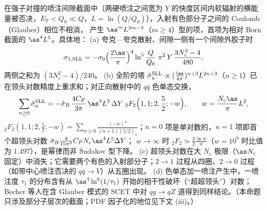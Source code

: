 \begin{proposition}\label{prop:jets-sll}
在强子对撞的喷注间隙截面中（两硬喷注之间宽为 $Y$ 的快度区间内软辐射的横能量被否决，$E_T<Q_0\ll Q$，$L=\ln(Q/Q_0)$），入射有色部分子之间的 Coulomb（Glauber）相位不相消，
产生 $\as^mL^{2m-3}$（$m\ge4$）型的项，首项为相对 Born 截面的 $\as^4L^5$\cite[式~(3.22)]{ForshawKyrieleisSeymour2006}。具体地：
(a) 夸克—夸克散射、间隙一侧有一个间隙外胶子时\cite[式~(3.24)]{ForshawKyrieleisSeymour2006}
\begin{equation}\label{eq:jets-sll-fks}
\sigma_{1,\rm SLL}=-\sigma_0\Big(\frac{2\as}{\pi}\Big)^4\ln^5\frac{Q}{Q_0}\;\pi^2\,Y\,\frac{3N_c^2-4}{480},
\end{equation}
两侧之和为 $(3N_c^2-4)/240$\cite[式~(2.22)]{Forshaw:2008cq}。
(b) 全阶的塔 $\hat\sigma_n^{\rm SLL}\propto(\frac{\as}{4\pi})^{n+3}L^{2n+3}$（$n\ge1$）已在领头对数精度上重求和\cite{Becher:2021zkk,Becher:2023mtx,Boer:2024hzh,Becher:2024nqc}；对正向散射中的 $q\bar q$ 色单态交换，
\begin{equation}\label{eq:jets-sll-bns}
\sum_{n\ge0}\hat\sigma_n^{\rm SLL}=-\hat\sigma_B\,\frac{4C_F}{3\pi}\,\as^3L^3\,\Delta Y\;{}_2F_2\Big(1,1;2,\frac52;-w\Big),\qquad w=\frac{N_c\as}{\pi}L^2,
\end{equation}
${}_2F_2(1,1;2,\frac52;-w)=\sum_{n\ge0}\frac{(-w)^n}{(n+1)(5/2)_n}$；$n=0$ 项是单对数的，$n=1$ 项即首个超领头对数 $\hat\sigma_B\frac{4}{15\pi^2}C_FN_c\as^4L^5\Delta Y$；
$w\to\infty$ 时 ${}_2F_2\simeq\frac32\frac{\ln w}{w}$（$w=10^8$ 时比值为 $1.497$），是幂律而非 Sudakov 型下降。
(c) 超领头对数在大 $N_c$ 极限（$\as N_c$ 固定）中消失；它需要两个有色的入射部分子；$2\to1$ 过程从四圈、$2\to0$ 过程（如带中心喷注否决的 $q\bar q\to V$）从五圈出现\cite{Becher:2021zkk}。
(d) 色单态加一喷注产生中，一喷注度 $\tau_1$ 的分布含有从 $\as^4\ln^6(1/\tau_1)$ 开始的相干性破坏（“超超领头”）对数\cite{Banfi:2025mra}；Becher 等人在含 Glauber 模式的 SCET 中对 $qg\to qZ$ 道得到同样结论\cite{Becher:2026kbr}。（本命题只涉及部分子层次的截面；PDF 因子化的地位见下文 (iii)。）
\end{proposition}

